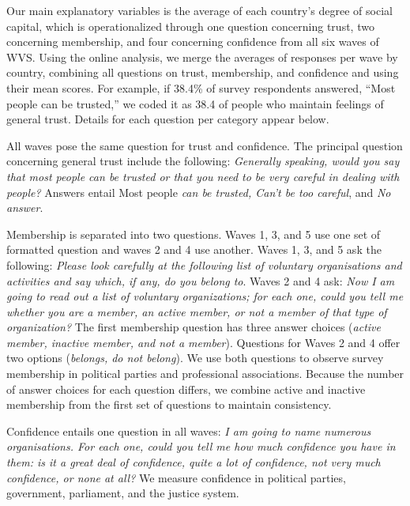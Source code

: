 \documentclass[
  english,
  man]{apa6}
\begin{document}
Our main explanatory variables is the average of each country's degree of social capital, which is operationalized through one question concerning trust, two concerning membership, and four concerning confidence from all six waves of WVS. Using the online analysis, we merge the averages of responses per wave by country, combining all questions on trust, membership, and confidence and using their mean scores. For example, if 38.4\% of survey respondents answered, ``Most people can be trusted,'' we coded it as 38.4 of people who maintain feelings of general trust. Details for each question per category appear below.

All waves pose the same question for trust and confidence. The principal question concerning general trust include the following: \emph{Generally speaking, would you say that most people can be trusted or that you need to be very careful in dealing with people?} Answers entail Most people \emph{can be trusted, Can't be too careful}, and \emph{No answer}.

Membership is separated into two questions. Waves 1, 3, and 5 use one set of formatted question and waves 2 and 4 use another. Waves 1, 3, and 5 ask the following: \emph{Please look carefully at the following list of voluntary organisations and activities and say which, if any, do you belong to}. Waves 2 and 4 ask: \emph{Now I am going to read out a list of voluntary organizations; for each one, could you tell me whether you are a member, an active member, or not a member of that type of organization?} The first membership question has three answer choices (\emph{active member, inactive member, and not a member}). Questions for Waves 2 and 4 offer two options (\emph{belongs, do not belong}). We use both questions to observe survey membership in political parties and professional associations. Because the number of answer choices for each question differs, we combine active and inactive membership from the first set of questions to maintain consistency.

Confidence entails one question in all waves: \emph{I am going to name numerous organisations. For each one, could you tell me how much confidence you have in them: is it a great deal of confidence, quite a lot of confidence, not very much confidence, or none at all?} We measure confidence in political parties, government, parliament, and the justice system.
\end{document}
